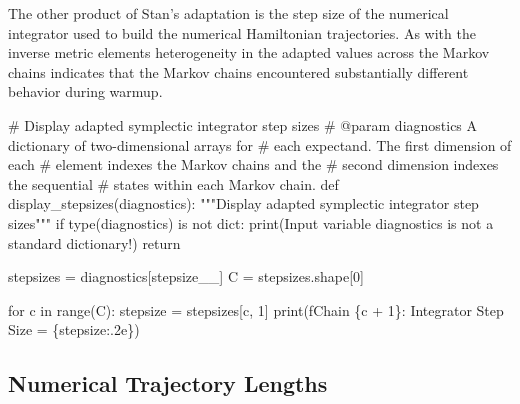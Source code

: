 \documentclass[
  letterpaper,
  DIV=11,
  numbers=noendperiod]{scrartcl}
\newenvironment{Shaded}{\begin{snugshade}}{\end{snugshade}}
\newcommand{\BuiltInTok}[1]{\textcolor[rgb]{0.00,0.23,0.31}{#1}}
\newcommand{\CommentTok}[1]{\textcolor[rgb]{0.37,0.37,0.37}{#1}}
\newcommand{\ControlFlowTok}[1]{\textcolor[rgb]{0.00,0.23,0.31}{#1}}
\newcommand{\DecValTok}[1]{\textcolor[rgb]{0.68,0.00,0.00}{#1}}
\newcommand{\KeywordTok}[1]{\textcolor[rgb]{0.00,0.23,0.31}{#1}}
\newcommand{\NormalTok}[1]{\textcolor[rgb]{0.00,0.23,0.31}{#1}}
\newcommand{\OperatorTok}[1]{\textcolor[rgb]{0.37,0.37,0.37}{#1}}
\newcommand{\SpecialCharTok}[1]{\textcolor[rgb]{0.37,0.37,0.37}{#1}}
\newcommand{\SpecialStringTok}[1]{\textcolor[rgb]{0.13,0.47,0.30}{#1}}
\newcommand{\StringTok}[1]{\textcolor[rgb]{0.13,0.47,0.30}{#1}}
\begin{document}
The other product of Stan's adaptation is the step size of the numerical
integrator used to build the numerical Hamiltonian trajectories. As with
the inverse metric elements heterogeneity in the adapted values across
the Markov chains indicates that the Markov chains encountered
substantially different behavior during warmup.

\begin{Shaded}
\begin{Highlighting}[]
\CommentTok{\# Display adapted symplectic integrator step sizes}
\CommentTok{\# @param diagnostics A dictionary of two{-}dimensional arrays for }
\CommentTok{\#                    each expectand.  The first dimension of each}
\CommentTok{\#                    element indexes the Markov chains and the }
\CommentTok{\#                    second dimension indexes the sequential }
\CommentTok{\#                    states within each Markov chain.}
\KeywordTok{def}\NormalTok{ display\_stepsizes(diagnostics):}
  \CommentTok{"""Display adapted symplectic integrator step sizes"""}
  \ControlFlowTok{if} \BuiltInTok{type}\NormalTok{(diagnostics) }\KeywordTok{is} \KeywordTok{not} \BuiltInTok{dict}\NormalTok{:}
    \BuiltInTok{print}\NormalTok{(}\StringTok{\textquotesingle{}Input variable \textasciigrave{}diagnostics\textasciigrave{} is not a standard dictionary!\textquotesingle{}}\NormalTok{)}
    \ControlFlowTok{return}
  
\NormalTok{  stepsizes }\OperatorTok{=}\NormalTok{ diagnostics[}\StringTok{\textquotesingle{}stepsize\_\_\textquotesingle{}}\NormalTok{]}
\NormalTok{  C }\OperatorTok{=}\NormalTok{ stepsizes.shape[}\DecValTok{0}\NormalTok{]}
  
  \ControlFlowTok{for}\NormalTok{ c }\KeywordTok{in} \BuiltInTok{range}\NormalTok{(C):}
\NormalTok{    stepsize }\OperatorTok{=}\NormalTok{ stepsizes[c, }\DecValTok{1}\NormalTok{]}
    \BuiltInTok{print}\NormalTok{(}\SpecialStringTok{f\textquotesingle{}Chain }\SpecialCharTok{\{}\NormalTok{c }\OperatorTok{+} \DecValTok{1}\SpecialCharTok{\}}\SpecialStringTok{: Integrator Step Size = }\SpecialCharTok{\{}\NormalTok{stepsize}\SpecialCharTok{:.2e\}}\SpecialStringTok{\textquotesingle{}}\NormalTok{)}
\end{Highlighting}
\end{Shaded}

\hypertarget{numerical-trajectory-lengths}{%
\subsection{Numerical Trajectory
Lengths}\label{numerical-trajectory-lengths}}
\end{document}
